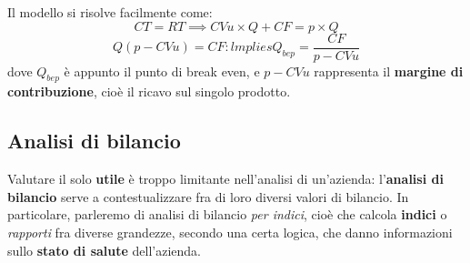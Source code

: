 \documentclass[a4paper,11pt]{article}
\begin{document}
Il modello si risolve facilmente come:
$$
CT = RT \implies CV u \times Q + CF = p \times Q
$$
$$
Q(p - CV u) = CF: lmplies Q_{bep} = \frac{CF}{p - CV u}
$$
dove $Q_{bep}$ è appunto il punto di break even, e $p - CVu$ rappresenta il \textbf{margine di contribuzione}, cioè il ricavo sul singolo prodotto.

\subsection{Analisi di bilancio}
Valutare il solo \textbf{utile} è troppo limitante nell'analisi di un'azienda: l'\textbf{analisi di bilancio} serve a contestualizzare fra di loro diversi valori di bilancio. 
In particolare, parleremo di analisi di bilancio \textit{per indici}, cioè che calcola \textbf{indici} o \textit{rapporti} fra diverse grandezze, secondo una certa logica, che danno informazioni sullo \textbf{stato di salute} dell'azienda.
\end{document}
